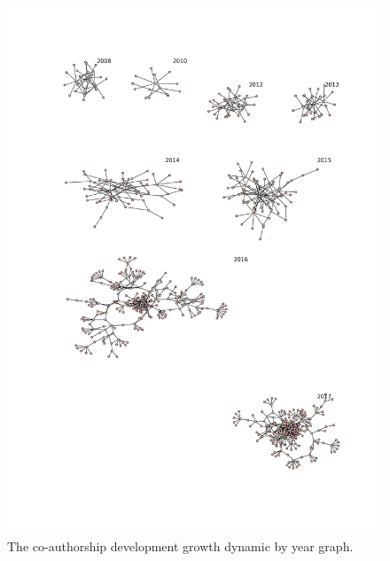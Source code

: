 \documentclass[12pt]{report}
\theoremstyle{definition}
\begin{document}
\begin{figure}[!ht]
	\centering
	\includegraphics[width=\textwidth]{guest3eng.png}
	\caption{The co-authorship development growth dynamic by year graph.}
	\label{fig:guest3}
\end{figure}
\end{document}

